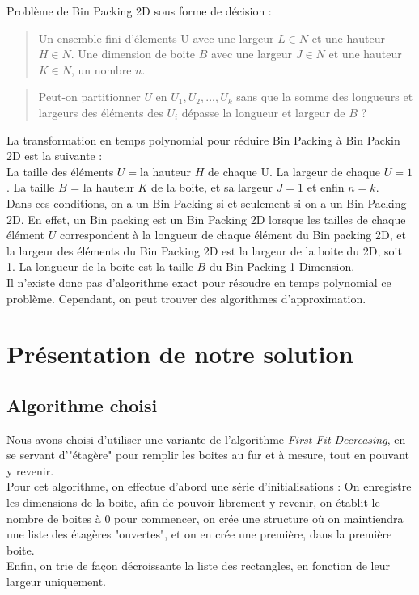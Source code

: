 \documentclass[12pt]{article}
\begin{document}
Problème de Bin Packing 2D sous forme de décision : \\
   \begin{quote}
Un ensemble fini d’élements U avec une largeur $L \in N$ et une hauteur $H \in N$. Une dimension de boite $B$ avec une largeur $J \in N$ et une hauteur $K \in N$, un nombre $n$.  \end{quote}
   \begin{quote}
 Peut-on partitionner  $U$ en $U_1, U_2, ..., U_k$ sans que la somme des longueurs et largeurs des éléments des $U_i$ dépasse la longueur et largeur de $B$ ?  \end{quote}
 
La transformation en temps polynomial pour réduire Bin Packing à Bin Packin 2D est la suivante : \\
La taille des éléments $U = $la hauteur $H$ de chaque U. La largeur de chaque $U = 1$. La taille $B$ = la hauteur $K$ de la boite, et sa largeur $J = 1$ et enfin $n=k$. \\ 
Dans ces conditions, on a un Bin Packing si et seulement si on a un Bin Packing 2D. En effet, un Bin packing est un Bin Packing 2D lorsque les tailles de chaque élément $U$ correspondent à la longueur de chaque élément du Bin packing 2D, et la largeur des éléments du Bin Packing 2D est la largeur de la boite du 2D, soit 1. La longueur de la boite est la taille $B$ du Bin Packing 1 Dimension. \\
Il n'existe donc pas d'algorithme exact pour résoudre en temps polynomial ce problème. Cependant, on peut trouver des algorithmes d'approximation. 

\newpage
\section{Présentation de notre solution}
\subsection*{Algorithme choisi}
Nous avons choisi d'utiliser une variante de l'algorithme \emph{First Fit Decreasing}, en se servant d'"étagère" pour remplir les boites au fur et à mesure, tout en pouvant y revenir. \\
Pour cet algorithme, on effectue d'abord une série d'initialisations : On enregistre les dimensions de la boite, afin de pouvoir librement y revenir, on établit le nombre de boites à 0 pour commencer, on crée une structure où on maintiendra une liste des étagères "ouvertes", et on en crée une première, dans la première boite. \\
Enfin, on trie de façon décroissante la liste des rectangles, en fonction de leur largeur uniquement. \\
\end{document}
